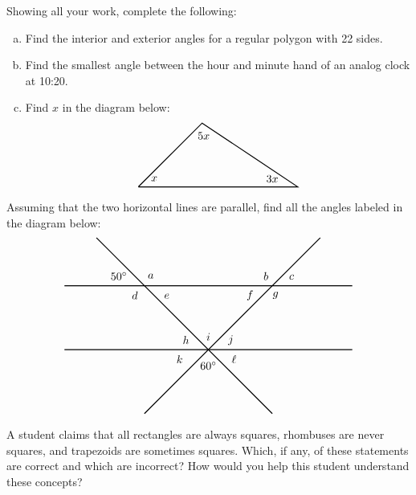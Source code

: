 \documentclass[11pt,letterpaper]{article}
\begin{document}

 Showing all your work, complete the following:
	\begin{enumerate}[(a)]
	\item Find the interior and exterior angles for a regular polygon with 22 sides. 
	\item Find the smallest angle between the hour and minute hand of an analog clock at 10:20. 
	\item Find $x$ in the diagram below:
		\[
		\begin{tikzpicture}
		\draw[line width=0.03cm] (0,0) -- (2,2) -- (5,0) -- (0,0);
		\node at (0.5,0.25) {$x$};
		\node at (2.05,1.6) {$5x$};
		\node at (4.2,0.25) {$3x$};
		\end{tikzpicture}
		\]
	\end{enumerate}



\newpage



 Assuming that the two horizontal lines are parallel, find all the angles labeled in the diagram below:
	\[
	\begin{tikzpicture}
	\draw[line width=0.03cm] (-4.5,2) -- (4.5,2);
	\draw[line width=0.03cm] (-4.5,0) -- (4.5,0);
	\draw[line width=0.03cm] (-2,-2) -- (3.5,3.5);
	\draw[line width=0.03cm] (-3.5,3.5) -- (2,-2);
	\node at (-2.8,2.3) {$50^\circ$};
	\node at (-1.8,2.3) {$a$};
	\node at (1.8,2.3) {$b$};
	\node at (2.6,2.27) {$c$};
	\node at (-2.3,1.7) {$d$};
	\node at (-1.3,1.67) {$e$};
	\node at (1.3,1.7) {$f$};
	\node at (2.1,1.7) {$g$};
	\node at (-0.7,0.3) {$h$};
	\node at (0,0.4) {$i$};
	\node at (0.7,0.3) {$j$};
	\node at (-0.9,-0.3) {$k$};
	\node at (0,-0.5) {$60^\circ$};
	\node at (0.8,-0.3) {$\ell$};
	\end{tikzpicture}
	\]



\newpage



 A student claims that all rectangles are always squares, rhombuses are never squares, and trapezoids are sometimes squares. Which, if any, of these statements are correct and which are incorrect? How would you help this student understand these concepts? 
\end{document}

